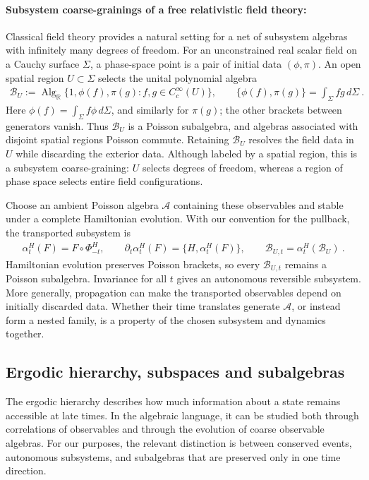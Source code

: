 \documentclass[a4paper,11pt]{article}
\theoremstyle{definition}
\begin{document}
\paragraph{Subsystem coarse-grainings of a free relativistic field theory:} Classical field theory provides a natural setting for a net of subsystem algebras with infinitely many degrees of freedom. For an unconstrained real scalar field on a Cauchy surface $\Sigma$, a phase-space point is a pair of initial data $(\phi,\pi)$. An open spatial region $U\subset\Sigma$ selects the unital polynomial algebra
\begin{align}
    \mathcal B_U
    :=\operatorname{Alg}_{\mathbb R}\{1,\phi(f),\pi(g):f,g\in C_c^\infty(U)\},
    \qquad
    \{\phi(f),\pi(g)\}=\int_\Sigma fg\,d\Sigma\ .
\end{align}
Here $\phi(f)=\int_\Sigma f\phi\,d\Sigma$, and similarly for $\pi(g)$; the other brackets between generators vanish. Thus $\mathcal B_U$ is a Poisson subalgebra, and algebras associated with disjoint spatial regions Poisson commute. Retaining $\mathcal B_U$ resolves the field data in $U$ while discarding the exterior data. Although labeled by a spatial region, this is a subsystem coarse-graining: $U$ selects degrees of freedom, whereas a region of phase space selects entire field configurations.


Choose an ambient Poisson algebra $\mathcal A$ containing these observables and stable under a complete Hamiltonian evolution. With our convention for the pullback, the transported subsystem is
\begin{align}
    \alpha_t^H(F)=F\circ\Phi_{-t}^H,
    \qquad \partial_t\alpha_t^H(F)=\{H,\alpha_t^H(F)\},
    \qquad \mathcal B_{U,t}=\alpha_t^H(\mathcal B_U)\ .
\end{align}
Hamiltonian evolution preserves Poisson brackets, so every $\mathcal B_{U,t}$ remains a Poisson subalgebra. Invariance for all $t$ gives an autonomous reversible subsystem. More generally, propagation can make the transported observables depend on initially discarded data. Whether their time translates generate $\mathcal A$, or instead form a nested family, is a property of the chosen subsystem and dynamics together.


\subsection{Ergodic hierarchy, subspaces and subalgebras}
\label{subsec:classical-ergodic-hierarchy}

The ergodic hierarchy describes how much information about a state remains accessible at late times. In the algebraic language, it can be studied both through correlations of observables and through the evolution of coarse observable algebras. For our purposes, the relevant distinction is between conserved events, autonomous subsystems, and subalgebras that are preserved only in one time direction.
\end{document}
